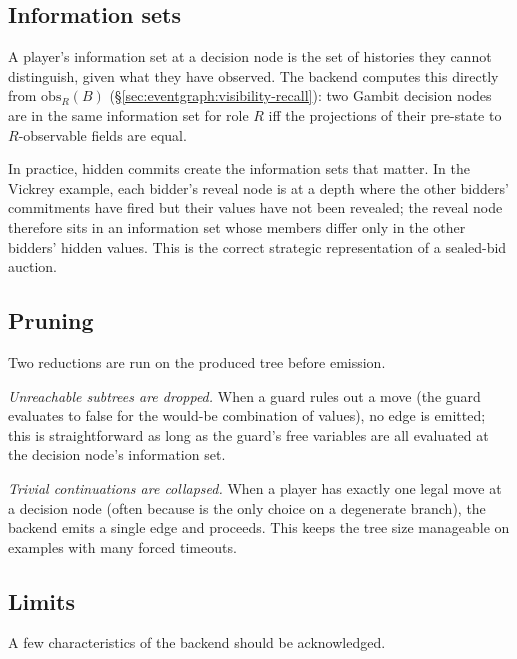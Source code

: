 \subsection{Information sets}

A player's information set at a decision node is the set of
histories they cannot distinguish, given what they have observed.
The backend computes this directly from
$\mathrm{obs}_R(B)$ (\S\ref{sec:eventgraph:visibility-recall}):
two Gambit decision nodes are in the same information set for
role $R$ iff the projections of their pre-state to
$R$-observable fields are equal.

In practice, hidden commits create the information sets that
matter.  In the Vickrey example, each bidder's reveal node is at a
depth where the other bidders' commitments have fired but their
values have not been revealed; the reveal node therefore sits in
an information set whose members differ only in the other
bidders' hidden values.  This is the correct strategic
representation of a sealed-bid auction.

\subsection{Pruning}

Two reductions are run on the produced tree before emission.

\emph{Unreachable subtrees are dropped.}  When a guard rules out a
move (the guard evaluates to false for the would-be combination of
values), no edge is emitted; this is straightforward as long as
the guard's free variables are all evaluated at the decision
node's information set.

\emph{Trivial continuations are collapsed.}  When a player has
exactly one legal move at a decision node (often because
 is the only choice on a degenerate branch), the
backend emits a single edge and proceeds.  This keeps the tree
size manageable on examples with many forced timeouts.

\subsection{Limits}

A few characteristics of the backend should be acknowledged.

